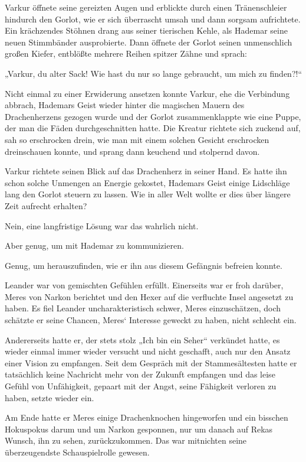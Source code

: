 Varkur öffnete seine gereizten Augen und erblickte durch einen Tränenschleier hindurch den Gorlot, wie er sich überrascht umsah und dann sorgsam aufrichtete. Ein krächzendes Stöhnen drang aus seiner tierischen Kehle, als Hademar seine neuen Stimmbänder ausprobierte. Dann öffnete der Gorlot seinen unmenschlich großen Kiefer, entblößte mehrere Reihen spitzer Zähne und sprach:

„Varkur, du alter Sack! Wie hast du nur so lange gebraucht, um mich zu finden?!“

Nicht einmal zu einer Erwiderung ansetzen konnte Varkur, ehe die Verbindung abbrach, Hademars Geist wieder hinter die magischen Mauern des Drachenherzens gezogen wurde und der Gorlot zusammenklappte wie eine Puppe, der man die Fäden durchgeschnitten hatte. Die Kreatur richtete sich zuckend auf, sah so erschrocken drein, wie man mit einem solchen Gesicht erschrocken dreinschauen konnte, und sprang dann keuchend und stolpernd davon.

Varkur richtete seinen Blick auf das Drachenherz in seiner Hand. Es hatte ihn schon solche Unmengen an Energie gekostet, Hademars Geist einige Lidschläge lang den Gorlot steuern zu lassen. Wie in aller Welt wollte er dies über längere Zeit aufrecht erhalten?

Nein, eine langfristige Lösung war das wahrlich nicht.

Aber genug, um mit Hademar zu kommunizieren.

Genug, um herauszufinden, wie er ihn aus diesem Gefängnis befreien konnte.\bigskip







Leander war von gemischten Gefühlen erfüllt. Einerseits war er froh darüber, Meres von Narkon berichtet und den Hexer auf die verfluchte Insel angesetzt zu haben. Es fiel Leander uncharakteristisch schwer, Meres einzuschätzen, doch schätzte er seine Chancen, Meres‘ Interesse geweckt zu haben, nicht schlecht ein.

Andererseits hatte er, der stets stolz „Ich bin ein Seher“ verkündet hatte, es wieder einmal immer wieder versucht und nicht geschafft, auch nur den Ansatz einer Vision zu empfangen. Seit dem Gespräch mit der Stammesältesten hatte er tatsächlich keine Nachricht mehr von der Zukunft empfangen und das leise Gefühl von Unfähigkeit, gepaart mit der Angst, seine Fähigkeit verloren zu haben, setzte wieder ein.

Am Ende hatte er Meres einige Drachenknochen hingeworfen und ein bisschen Hokuspokus darum und um Narkon gesponnen, nur um danach auf Rekas Wunsch, ihn zu sehen, zurückzukommen. Das war mitnichten seine überzeugendste Schauspielrolle gewesen.

